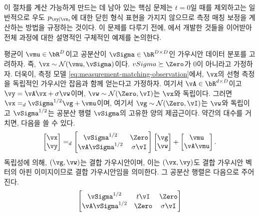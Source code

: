 \documentclass[../../book-main_ko.tex]{subfiles}
\begin{document}
이 절차를 계산 가능하게 만드는 데 남아 있는 핵심 문제는 $t=0$일 때를 제외하고는 일반적으로 우도 $p_{\vy \mid \vx_t}$에 대한 닫힌 형식 표현을 가지지 않으므로 측정 매칭 보정을 계산하는 방법을 규정하는 것이다. 이 문제를 다루기 전에, 에서 개발한 것들을 이어받아 전체 과정에 대한 설명적인 구체적인 예제를 논의한다.

\begin{example}\label{example:denoising-conditional-gaussian}
  평균이 $\vmu \in \bR^D$이고
  공분산이 $\vSigma \in \bR^{D \times D}$인 가우시안 데이터 분포를 고려하자. 즉, $\vx \sim \mathcal{N}(\vmu, \vSigma)$이다.
  $\\vSigma \succeq \Zero$가 0이 아니라고 가정하자.
  더욱이, 측정 모델 \eqref{eq:measurement-matching-observation}에서, $\vx$의 선형 측정을 독립적인 가우시안 잡음과 함께 얻는다고 가정하자. 여기서 $\vA \in \bR^{d \times D}$이고 $\vy = \vA \vx + \sigma \vw$이며, $\vw \sim \mathcal{N}(\Zero, \vI)$는 $\vx$와 독립이다.
  그러면 $\vx =_{d} \vSigma^{1/2} \vg + \vmu$이며, 여기서 $\vg \sim \mathcal{N}(\Zero, \vI)$는 $\vw$와 독립이고 $\vSigma^{1/2}$는 공분산 행렬 $\vSigma$의 고유한 양의 제곱근이다.
  약간의 대수를 거치면, 다음을 쓸 수 있다.
  \begin{equation*}
    \begin{bmatrix}
      \vx \\
      \vy
    \end{bmatrix}
    =_{d}
    \begin{bmatrix}
      \vSigma^{1/2} & \Zero \\
      \vA \vSigma^{1/2} & \sigma \vI
    \end{bmatrix}
    \begin{bmatrix}
      \vg \\
      \vw
    \end{bmatrix}
    + 
    \begin{bmatrix}
      \vmu \\
      \vA\vmu
    \end{bmatrix}.
  \end{equation*}
  독립성에 의해, $(\vg, \vw)$는 결합 가우시안이며, 이는 $(\vx, \vy)$도 결합 가우시안 벡터의 아핀 이미지이므로 결합 가우시안임을 의미한다.
  그 공분산 행렬은 다음으로 주어진다.
  \begin{equation*}
    \begin{bmatrix}
      \vSigma^{1/2} & t\vI & \Zero \\
      \vA \vSigma^{1/2} & \Zero & \sigma \vI
    \end{bmatrix}

\end{equation*}
\end{example}
\end{document}
